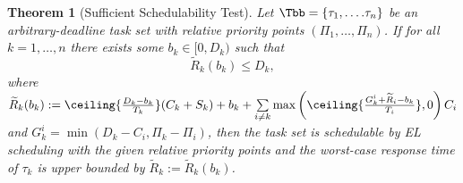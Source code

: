 \documentclass[conference]{IEEEtran}
\newtheorem{thm}{Theorem}%
\theoremstyle{definition}
\theoremstyle{remark}
\newcommand{\Rtilde}{\widetilde{R}}
\begin{document}
	\begin{thm}[Sufficient Schedulability Test]\label{thm:suff_sched_test_fixed}
		Let $\Tbb = \{\tau_1,\dots.\tau_n\}$ be an arbitrary-deadline task set with relative priority points $(\Pi_1, \dots, \Pi_n)$.
		If for all $k=1, \dots, n$ there exists some $b_k \in [0,D_k)$ such that
		\begin{equation}\label{eq:suff_sched_test_fixed}
			\Rtilde_k(b_k)
			\leq D_k,
		\end{equation}
		where $\Rtilde_k(b_k):=\ceiling{\frac{D_k-b_k}{T_k}}(C_k + S_k) + b_k + \sum\limits_{i\neq k} \max\left(\ceiling{\frac{G_k^i+ \Rtilde_i-b_k}{T_i}}, 0\right) C_i$
		and 
		$G^i_k = \min(D_k-C_i, \Pi_k-\Pi_i)$,
		then the task set is schedulable by EL scheduling with the given relative priority points and the worst-case response time of $\tau_k$ is upper bounded by $\Rtilde_k := \Rtilde_k(b_k)$.
	\end{thm}
	
\end{document}
